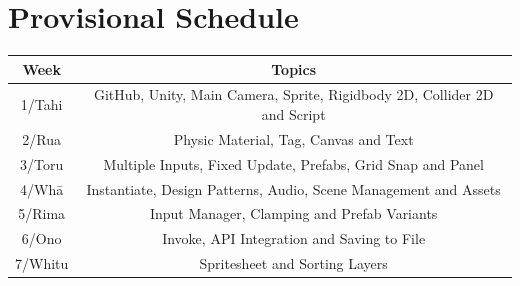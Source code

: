 \documentclass{article}
\begin{document}
\section*{Provisional Schedule}
\renewcommand{\arraystretch}{1.5}
\begin{tabular}{|c|c|c|}
	\hline
	\textbf{Week}                  & \multicolumn{2}{c|}{\textbf{Topics}}                                                                                             \\ \hline
	1/Tahi           & \multicolumn{2}{c|}{GitHub, Unity, Main Camera, Sprite, Rigidbody 2D, Collider 2D and Script}    \\ \hline
	2/Rua            & \multicolumn{2}{c|}{Physic Material, Tag, Canvas and Text}                    \\ \hline
	3/Toru           & \multicolumn{2}{c|}{Multiple Inputs, Fixed Update, Prefabs, Grid Snap and Panel} \\ \hline 
	4/Whā            & \multicolumn{2}{c|}{Instantiate, Design Patterns, Audio, Scene Management and Assets}                               \\ \hline
	5/Rima           & \multicolumn{2}{c|}{Input Manager, Clamping and Prefab Variants}                                                \\ \hline
	6/Ono            & \multicolumn{2}{c|}{Invoke, API Integration and Saving to File}                                                   \\ \hline
	7/Whitu          &  \multicolumn{2}{c|}{Spritesheet and Sorting Layers}                            \\ \hline


\end{tabular}
\end{document}
